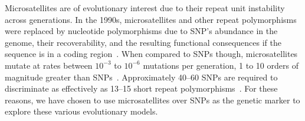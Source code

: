 Microsatellites are of evolutionary interest due to their repeat unit instability across generations.
In the 1990s, microsatellites and other repeat polymorphisms were replaced by nucleotide polymorphisms due to
SNP's abundance in the genome, their recoverability, and the resulting functional consequences if the sequence is in
a coding region~\cite{graySingleNucleotidePolymorphisms2000,butlerSTRsVsSNPs2007}.
When compared to SNPs though, microsatellites mutate at rates between $10^{-3}$ to $10^{-6}$ mutations per generation,
1 to 10 orders of magnitude greater than SNPs~\cite{gemayelJunkVariableTandemRepeats2012}.
Approximately 40--60 SNPs are required to discriminate as effectively as 13--15 short repeat
polymorphisms~\cite{butlerSTRsVsSNPs2007}.
For these reasons, we have chosen to use microsatellites over SNPs as the genetic marker to explore
these various evolutionary models.
